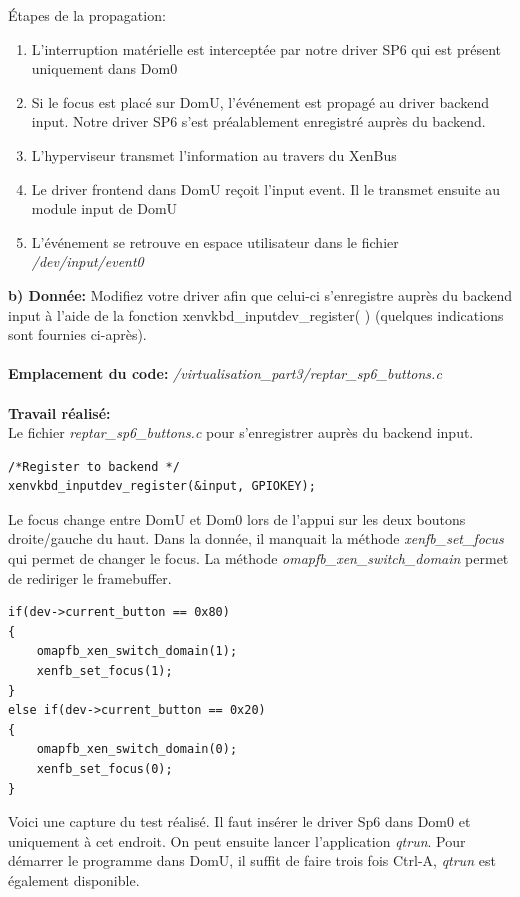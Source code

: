 Étapes de la propagation:
\begin{enumerate}
	\item L'interruption matérielle est interceptée par notre driver SP6 qui est présent uniquement dans Dom0
	\item Si le focus est placé sur DomU, l'événement est propagé au driver backend input. Notre driver SP6 s'est préalablement enregistré auprès du backend.
	\item L'hyperviseur transmet l'information au travers du XenBus
	\item Le driver frontend dans DomU reçoit l'input event. Il le transmet ensuite au module input de DomU
	\item L'événement se retrouve en espace utilisateur dans le fichier \textit{/dev/input/event0}\\
\end{enumerate}
\textbf{b) Donnée: }Modifiez votre driver afin que celui-ci s'enregistre auprès du backend input à l'aide de la fonction
xenvkbd\_inputdev\_register( ) (quelques indications sont fournies ci-après).\\\\
\textbf{Emplacement du code: }\textit{/virtualisation\_part3/reptar\_sp6\_buttons.c}\\\\
\textbf{Travail réalisé: }\\Le fichier \textit{reptar\_sp6\_buttons.c} pour s'enregistrer auprès du backend input.
\begin{lstlisting}
/*Register to backend */
xenvkbd_inputdev_register(&input, GPIOKEY);
\end{lstlisting}
Le focus change entre DomU et Dom0 lors de l'appui sur les deux boutons droite/gauche du haut. Dans la donnée, il manquait la méthode \textit{xenfb\_set\_focus} qui permet de changer le focus. La méthode \textit{omapfb\_xen\_switch\_domain} permet de rediriger le framebuffer.
\begin{lstlisting}
if(dev->current_button == 0x80)
{
	omapfb_xen_switch_domain(1);
	xenfb_set_focus(1);
}
else if(dev->current_button == 0x20)
{
	omapfb_xen_switch_domain(0);
	xenfb_set_focus(0);
}
\end{lstlisting}
Voici une capture du test réalisé. Il faut insérer le driver Sp6 dans Dom0 et uniquement à cet endroit. On peut ensuite lancer l'application \textit{qtrun}. Pour démarrer le programme dans DomU, il suffit de faire trois fois Ctrl-A, \textit{qtrun} est également disponible.
